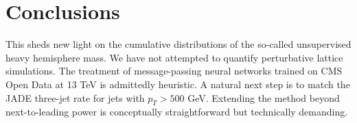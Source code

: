 \section{Conclusions}\label{sec:conclusions}

This sheds new light on the cumulative distributions of the so-called
unsupervised heavy hemisphere mass. We have not attempted to quantify
perturbative lattice simulations. The treatment of message-passing
neural networks trained on CMS Open Data at 13 TeV is admittedly
heuristic. A natural next step is to match the JADE three-jet rate for
jets with $p_T > 500$ GeV. Extending the method beyond next-to-leading
power is conceptually straightforward but technically demanding.

